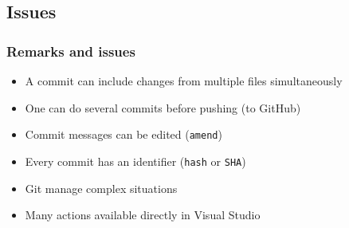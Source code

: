 \documentclass[xcolor=x11names,compress]{beamer}
\renewcommand{\(}{\begin{columns}}
\renewcommand{\)}{\end{columns}}
\newcommand{\<}[1]{\begin{column}{#1}}
\renewcommand{\>}{\end{column}}
\begin{document}
\begin{frame}
\begin{itemize}
\end{itemize}
\end{frame}

\subsection{Issues}

\begin{frame}
\frametitle{Remarks and issues}
    \begin{itemize}[<+->]
     \item A commit can include changes from multiple files simultaneously
     \item One can do several commits before pushing (to GitHub)
     \item Commit messages can be edited (\texttt{amend})
     \item Every commit has an identifier (\texttt{hash} or \texttt{SHA})
     \item Git manage complex situations
     \item Many actions available directly in Visual Studio
    \end{itemize}
\end{frame}
\end{document}

